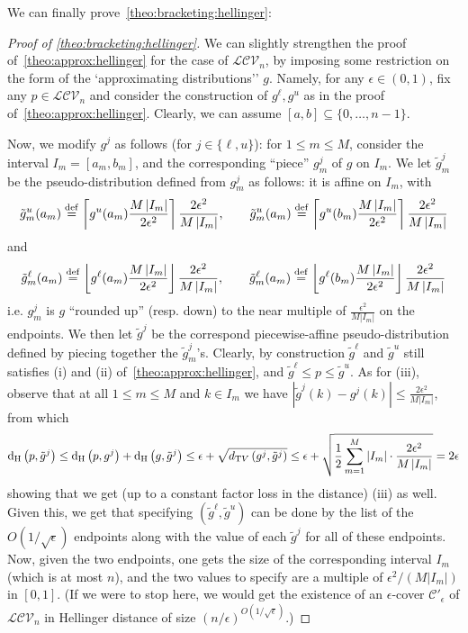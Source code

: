 \documentclass[11pt]{article}
\theoremstyle{definition}
\newcommand{\dtv}{d_{\mathrm TV}}
\newcommand{\eps}{\epsilon}
\newcommand{\abs}[1]{\lvert#1\rvert}
\newcommand{\eqdef}{\stackrel{{\mathrm {\footnotesize def}}}{=}}
\renewcommand{\abs}[1]{\left\lvert #1 \right\rvert}
\newcommand{\flr}[1]{\left\lfloor #1 \right\rfloor}
\newcommand{\classlogconcave}{\ensuremath{\mathcal{LCV}}\xspace}
\newcommand{\hellinger}[2]{{\operatorname{d_{\rm{}H}}\left({#1, #2}\right)}}
\newcommand{\class}{\ensuremath{\mathcal{C}}\xspace} \newenvironment{proofof}[1]{\begin{proof}[Proof of {#1}]}{\end{proof}}
\newcommand{\totalvardist}[2]{{\dtv\left({#1, #2}\right)}}
\begin{document}
\noindent We can finally prove~\cref{theo:bracketing:hellinger}:
\begin{proofof}{\cref{theo:bracketing:hellinger}}
We can slightly strengthen the proof of~\cref{theo:approx:hellinger} for the case of $\classlogconcave_n$, by imposing some restriction on the form of the `approximating distributions'' $g$. Namely, for any $\eps\in(0,1)$, fix any $p\in\classlogconcave_n$ and consider the construction of $g^\ell,g^u$ as in the proof of~\cref{theo:approx:hellinger}. Clearly, we can assume $[a,b]\subseteq\{0,\dots,n-1\}$. 

Now, we modify $g^j$ as follows (for $j\in\{\ell,u\}$): for $1\leq m\leq M$, consider the interval $I_m=[a_m,b_m]$, and the corresponding ``piece'' $g^j_m$ of $g$ on $I_m$. We let $\tilde{g}^j_m$ be the pseudo-distribution defined from $g^j_m$ as follows: it is affine on $I_m$, with
\[
\tilde{g}^u_m(a_m) \eqdef \clg{g^u(a_m)\frac{M\abs{I_m}}{2\eps^2}}\frac{2\eps^2}{M\abs{I_m}}, \qquad \tilde{g}^u_m(a_m) \eqdef \clg{g^u(b_m)\frac{M\abs{I_m}}{2\eps^2}}\frac{2\eps^2}{M\abs{I_m}}
\]
and
\[
\tilde{g}^\ell_m(a_m) \eqdef \flr{g^\ell(a_m)\frac{M\abs{I_m}}{2\eps^2}}\frac{2\eps^2}{M\abs{I_m}}, \qquad \tilde{g}^\ell_m(a_m) \eqdef \flr{g^\ell(b_m)\frac{M\abs{I_m}}{2\eps^2}}\frac{2\eps^2}{M\abs{I_m}}
\]
i.e. $g^j_m$ is $g$ ``rounded up'' (resp. down) to the near multiple of $\frac{\eps^2}{M\abs{I_m}}$ on the endpoints. We then let $\tilde{g}^j$ be the correspond piecewise-affine pseudo-distribution defined by piecing together the $\tilde{g}^j_m$'s. Clearly, by construction $\tilde{g}^\ell$ and $\tilde{g}^u$ still satisfies (i) and (ii) of~\cref{theo:approx:hellinger}, and $\tilde{g}^\ell\leq p\leq\tilde{g}^u$. As for (iii), observe that at all $1\leq m\leq M$ and $k\in I_m$ we have $\abs{\tilde{g}^j(k)-g^j(k)} \leq \frac{2\eps^2}{M\abs{I_m}}$, from which
\[
  \hellinger{p}{\tilde{g}^j} \leq \hellinger{p}{g^j} + \hellinger{g}{\tilde{g}^j}
  \leq \eps + \sqrt{\totalvardist{g^j}{\tilde{g}^j}}
  \leq \eps + \sqrt{\frac{1}{2}\sum_{m=1}^M \abs{I_m}\cdot\frac{2\eps^2}{M\abs{I_m}}}
  = 2\eps
\]
showing that we get (up to a constant factor loss in the distance) (iii) as well. Given this, we get that specifying $(\tilde{g}^\ell,\tilde{g}^u)$ can be done by the list of the $O(1/\sqrt{\eps})$ endpoints along with the value of each $\tilde{g}^j$ for all of these endpoints. Now, given the two endpoints, one gets the size of the corresponding interval $I_m$ (which is at most $n$), and the two values to specify are a multiple of $\eps^2/(M\abs{I_m})$ in $[0,1]$. (If we were to stop here, we would get the existence of an $\eps$-cover $\class'_\eps$ of $\classlogconcave_n$ in Hellinger distance of size $(n/\eps)^{O(1/\sqrt{\eps})}$.)



\end{proofof}
\end{document}
